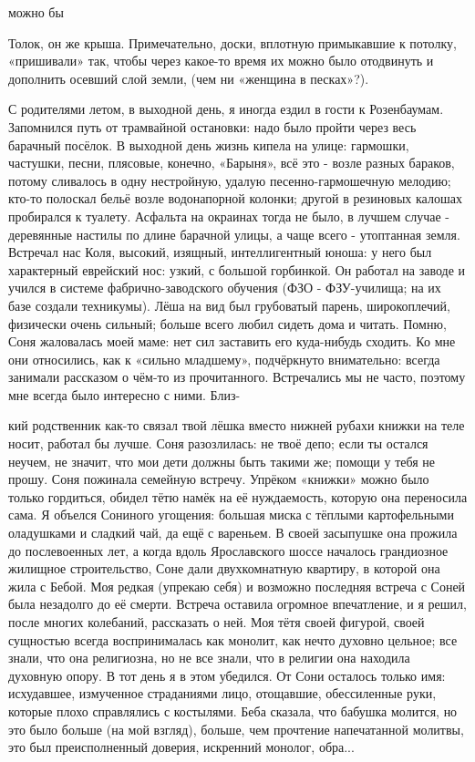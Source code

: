 можно бы

Толок, он же крыша. Примечательно, доски, вплотную примыкавшие к потолку, «пришивали» так, чтобы через какое-то время их можно было отодвинуть и дополнить осевший слой земли, (чем ни «женщина в песках»?).

С родителями летом, в выходной день, я иногда ездил в гости к Розенбаумам. Запомнился путь от трамвайной остановки: надо было пройти через весь барачный посёлок. В выходной день жизнь кипела на улице: гармошки, частушки, песни, плясовые, конечно, «Барыня», всё это - возле разных бараков, потому сливалось в одну нестройную, удалую песенно-гармошечную мелодию; кто-то полоскал бельё возле водонапорной колонки; другой в резиновых калошах пробирался к туалету. Асфальта на окраинах тогда не было, в лучшем случае - деревянные настилы по длине барачной улицы, а чаще всего - утоптанная земля. Встречал нас Коля, высокий, изящный, интеллигентный юноша: у него был характерный еврейский нос: узкий, с большой горбинкой. Он работал на заводе и учился в системе фабрично-заводского обучения (ФЗО - ФЗУ-училища; на их базе создали техникумы). Лёша на вид был грубоватый парень, широкоплечий, физически очень сильный; больше всего любил сидеть дома и читать. Помню, Соня жаловалась моей маме: нет сил заставить его куда-нибудь сходить. Ко мне они относились, как к «сильно младшему», подчёркнуто внимательно: всегда занимали рассказом о чём-то из прочитанного. Встречались мы не часто, поэтому мне всегда было интересно с ними. Близ-

кий родственник как-то связал твой лёшка вместо нижней рубахи книжки на теле носит, работал бы лучше. Соня разозлилась: не твоё депо; если ты остался неучем, не значит, что мои дети должны быть такими же; помощи у тебя не прошу. Соня пожинала семейную встречу. Упрёком «книжки» можно было только гордиться, обидел тётю намёк на её нуждаемость, которую она переносила сама. Я объелся Сониного угощения: большая миска с тёплыми картофельными оладушками и сладкий чай, да ещё с вареньем. В своей засыпушке она прожила до послевоенных лет, а когда вдоль Ярославского шоссе началось грандиозное жилищное строительство, Соне дали двухкомнатную квартиру, в которой она жила с Бебой. Моя редкая (упрекаю себя) и возможно последняя встреча с Соней была незадолго до её смерти. Встреча оставила огромное впечатление, и я решил, после многих колебаний, рассказать о ней. Моя тётя своей фигурой, своей сущностью всегда воспринималась как монолит, как нечто духовно цельное; все знали, что она религиозна, но не все знали, что в религии она находила духовную опору. В тот день я в этом убедился. От Сони осталось только имя: исхудавшее, измученное страданиями лицо, отощавшие, обессиленные руки, которые плохо справлялись с костылями. Беба сказала, что бабушка молится, но это было больше (на мой взгляд), больше, чем прочтение напечатанной молитвы, это был преисполненный доверия, искренний монолог, обра...

